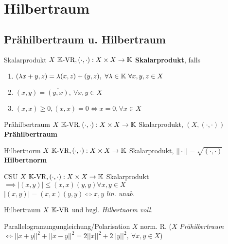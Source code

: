 \section{Hilbertraum}

\subsection{Prähilbertraum u. Hilbertraum}

\begin{definition}{Skalarprodukt}
  $X \ \mathbb{K} \text{-VR}, (\cdot,\cdot):X \times X \to \mathbb{K}$ \textbf{Skalarprodukt}, falls
  \begin{enumerate}[label=(\roman*)]
    \item $(\lambda x +y,z) = \lambda (x,z) + (y,z),\ \forall \lambda \in \mathbb{K}\
      \forall x,y,z \in X$
    \item $(x,y) = \overline{(y,x)},\ \forall x,y \in X $
    \item $(x,x) \geq 0, (x,x) = 0 \Leftrightarrow x = 0, \forall x\in X$
  \end{enumerate}
\end{definition}

\begin{definition}{Prähilbertraum}
  $X \ \mathbb{K} \text{-VR}, (\cdot,\cdot):X \times X \to \mathbb{K}$ Skalarprodukt, $(X,(\cdot,\cdot))$
  \textbf{Prähilbertraum}
\end{definition}

\begin{definition}{Hilbertnorm}
  $X \ \mathbb{K} \text{-VR}, (\cdot,\cdot):X \times X \to \mathbb{K}$ Skalarprodukt, $||\cdot|| =
  \sqrt{(\cdot,\cdot)}$ \textbf{Hilbertnorm}
\end{definition}

\begin{satz}{CSU}
  $X \ \mathbb{K} \text{-VR}, (\cdot,\cdot):X \times X \to \mathbb{K}$ Skalarprodukt
  $\implies |(x,y)| \leq (x,x)(y,y) \forall x,y\in X $\\
  $|(x,y)| = (x,x)(y,y) \Leftrightarrow x,y$ \textit{lin. unab.}
\end{satz}

\begin{definition}{Hilbertraum}
  $X \ \mathbb{K} \text{-VR}$ und bzgl. \textit{Hilbertnorm voll.}
\end{definition}

\begin{satz}{Parallelogramungungleichung/Polarisation}
  $X$ norm. R. ($X$ \textit{Prähilbertraum} $\Leftrightarrow
  ||x+y||^2 + ||x-y||^2 = 2||x||^2 + 2||y||^2,\ \forall x,y\in X$)
\end{satz}

